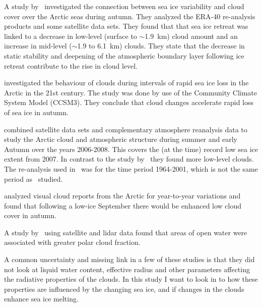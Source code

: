 A study by~\citet{Schweiger2008} investigated the connection between sea ice variability and cloud cover over the Arctic seas during autumn. They analyzed the ERA-40 re-analysis products and some satellite data sets. %
They found that that sea ice retreat was linked to a decrease in low-level (surface to $\sim$1.9~km) cloud amount and an increase in mid-level ($\sim$1.9 to 6.1~km) clouds. They state that the decrease in static stability and deepening of the atmospheric boundary layer following ice retreat contribute to the rise in cloud level. 

\citet{Vavrus2010} investigated the behaviour of clouds during intervals of rapid sea ice loss in the Arctic in the 21st century. The study was done by use of the Community Climate System Model (CCSM3). They conclude that cloud changes accelerate rapid loss of sea ice in autumn. %

\citet{Kay2009} combined satellite data sets and complementary atmosphere reanalysis data to study the Arctic cloud and atmospheric structure during summer and early Autumn over the years 2006-2008. This covers the (at the time) record low sea ice extent from 2007. In contrast to the study by~\citet{Schweiger2008} they found more low-level clouds. The re-analysis used in~\citet{Schweiger2008} was for the time period 1964-2001, which is not the same period as~\citet{Kay2009} studied. %

\citet{Eastman2010a} analyzed visual cloud reports from the Arctic for year-to-year variations and found that following a low-ice September there would be enhanced low cloud cover in autumn.

A study by~\citet{Palm2010} using satellite and lidar data  found that areas of open water were associated with greater polar cloud fraction. %

A common uncertainty and missing link in a few of these studies is that they did not look at liquid water content, effective radius and other parameters affecting the radiative properties of the clouds. In this study I want to look in to how these properties are influenced by the changing sea ice, and if changes in the clouds enhance sea ice melting.

